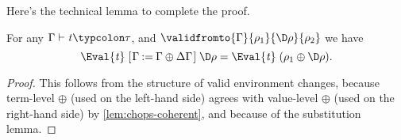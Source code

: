 Here's the technical lemma to complete the proof.
\begin{lemma}
  \label{thm:derive-correct-syntactic-env-lemma}
  For any \ensuremath{\Gamma\vdash\Varid{t}\typcolon\tau}, and \ensuremath{\validfromto{\Gamma}{\rho_{1}}{\D\rho}{\rho_{2}}}
  we have
  \[\ensuremath{\Eval{\Varid{t}}\;[\mskip1.5mu \Gamma\mathbin{:=}\Gamma\oplus \Delta \Gamma\mskip1.5mu]\;\D\rho\mathrel{=}\Eval{\Varid{t}}\;(\rho_{1}\oplus \D\rho)}.\]
\end{lemma}
\begin{proof}
  This follows from the structure of valid environment changes,
  because term-level \ensuremath{\oplus } (used on the left-hand side) agrees with
  value-level \ensuremath{\oplus } (used on the right-hand side) by
  \cref{lem:chops-coherent}, and because of the substitution lemma.


\end{proof}
